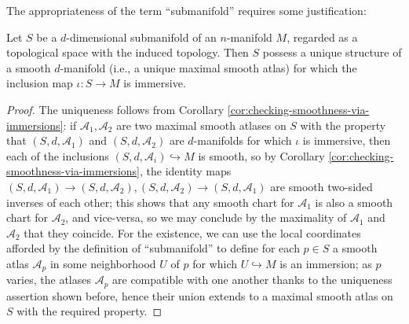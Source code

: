 \documentclass[reqno]{amsart} 
\begin{document}
The appropriateness of the term ``submanifold''
requires some justification:
\begin{theorem}\label{thm:characterize-submanifold-smooth-structure}
  Let $S$ be a $d$-dimensional submanifold
  of an $n$-manifold $M$, regarded as a topological space
  with the induced topology.
  Then $S$ possess a unique structure of a smooth $d$-manifold
  (i.e., a unique maximal smooth atlas)
  for which the inclusion map
  $\iota : S \rightarrow M$
  is immersive.
\end{theorem}
\begin{proof}
  The uniqueness follows from Corollary \ref{cor:checking-smoothness-via-immersions}: 
  if $\mathcal{A}_1, \mathcal{A}_2$ are two maximal smooth atlases on $S$
  with the property that $(S,d,\mathcal{A}_1)$
  and $(S,d,\mathcal{A}_2)$
  are $d$-manifolds
  for which $\iota$ is immersive,
  then each of the inclusions
  $(S,d,\mathcal{A}_i) \hookrightarrow M$ is smooth,
  so by Corollary \ref{cor:checking-smoothness-via-immersions},
  the identity maps
  $(S,d,\mathcal{A}_1) \rightarrow (S,d,\mathcal{A}_2),
  (S,d,\mathcal{A}_2) \rightarrow (S,d,\mathcal{A}_1)$
  are smooth two-sided inverses of each other;
  this shows that any smooth chart for $\mathcal{A}_1$
  is also a smooth chart for $\mathcal{A}_2$, and vice-versa,
  so we may conclude by the maximality of $\mathcal{A}_1$ and
  $\mathcal{A}_2$
  that they coincide.
  For the existence,
  we can
  use the local coordinates afforded by the definition of
  ``submanifold'' to define for each $p \in S$
  a smooth atlas $\mathcal{A}_p$ in some neighborhood $U$
  of $p$ for which $U \hookrightarrow M$ is an immersion;
  as $p$ varies, the atlases $\mathcal{A}_p$ are compatible with
  one another thanks
  to the uniqueness assertion shown before, hence their union
  extends to a maximal smooth atlas on $S$ with the required property.
\end{proof}
\end{document}

